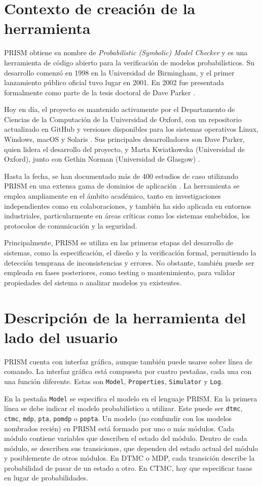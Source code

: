 \documentclass[runningheads]{llncs}
\begin{document}
\section{Contexto de creación de la herramienta}
PRISM obtiene su nombre de \textit{Probabilistic (Symbolic) Model Checker} y es una herramienta de código abierto para la verificación de modelos probabilísticos. Su desarrollo comenzó en 1998 en la Universidad de Birmingham, y el primer lanzamiento público oficial tuvo lugar en 2001. En 2002 fue presentada formalmente como parte de la tesis doctoral de Dave Parker \cite{Par02}.

Hoy en día, el proyecto es mantenido activamente por el Departamento de Ciencias de la Computación de la Universidad de Oxford, con un repositorio actualizado en GitHub \cite{PRISMGitHub} y versiones disponibles para los sistemas operativos Linux, Windows, macOS y Solaris \cite{PRISMOxford}. Sus principales desarrolladores son Dave Parker, quien lidera el desarrollo del proyecto, y Marta Kwiatkowska (Universidad de Oxford), junto con Gethin Norman (Universidad de Glasgow) \cite{KNP09a}.

Hasta la fecha, se han documentado más de 400 estudios de caso utilizando PRISM en una extensa gama de dominios de aplicación \cite{KwiatkowskaEtaps2024}. La herramienta se emplea ampliamente en el ámbito académico, tanto en investigaciones independientes como en colaboraciones, y también ha sido aplicada en entornos industriales, particularmente en áreas críticas como los sistemas embebidos, los protocolos de comunicación y la seguridad.

Principalmente, PRISM se utiliza en las primeras etapas del desarrollo de sistemas, como la especificación, el diseño y la verificación formal, permitiendo la detección temprana de inconsistencias y errores. No obstante, también puede ser empleada en fases posteriores, como testing o mantenimiento, para validar propiedades del sistema o analizar modelos ya existentes.

\section{Descripción de la herramienta del lado del usuario}
PRISM cuenta con interfaz gráfica, aunque también puede usarse sobre línea de comando. La interfaz gráfica está compuesta por cuatro pestañas, cada una con una función diferente. Estas son \texttt{Model}, \texttt{Properties}, \texttt{Simulator} y \texttt{Log}.

En la pestaña \texttt{Model} se especifica el modelo en el lenguaje PRISM. En la primera línea se debe indicar el modelo probabilístico a utilizar. Este puede ser \texttt{dtmc}, \texttt{ctmc}, \texttt{mdp}, \texttt{pta}, \texttt{pomdp} o \texttt{popta}. Un modelo (no confundir con los modelos nombrados recién) en PRISM está formado por uno o más módulos. Cada módulo contiene variables que describen el estado del módulo. Dentro de cada módulo, se describen sus transiciones, que dependen del estado actual del módulo y posiblemente de otros módulos. En DTMC o MDP, cada transición describe la probabilidad de pasar de un estado a otro. En CTMC, hay que especificar tasas en lugar de probabilidades.
\end{document}
